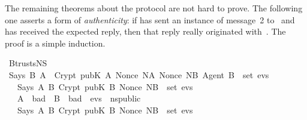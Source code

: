 \begin{isabellebody}
\begin{isamarkuptxt}
The remaining theorems about the protocol are not hard to prove.  The
following one asserts a form of \emph{authenticity}: if
 has sent an instance of message~2 to~ and has received the
expected reply, then that reply really originated with~.  The
proof is a simple induction.%
\end{isamarkuptxt}%
\isamarkuptrue%
%
\endisatagproof
{\isafoldproof}%
%
\isadelimproof
%
\endisadelimproof
%
\isadelimproof
%
\endisadelimproof
%
\isatagproof
%
\endisatagproof
{\isafoldproof}%
%
\isadelimproof
%
\endisadelimproof
{}\isamarkupfalse%
\ B{}trusts{}NS{}{}\isanewline
\ {}{}Says\ B\ A\ \ {}Crypt\ {}pubK\ A{}\ {}Nonce\ NA{}\ Nonce\ NB{}\ Agent\ B{}{}\ {}\ set\ evs{}\isanewline
\ \ \ Says\ A{}\ B\ {}Crypt\ {}pubK\ B{}\ {}Nonce\ NB{}{}\ {}\ set\ evs{}\isanewline
\ \ \ A\ {}\ bad{}\ \ B\ {}\ bad{}\ \ evs\ {}\ ns{}public{}\isanewline
\ \ {}\ Says\ A\ B\ {}Crypt\ {}pubK\ B{}\ {}Nonce\ NB{}{}\ {}\ set\ evs{}%
\isadelimproof
%
\endisadelimproof
%
\isatagproof
%
\endisatagproof
{\isafoldproof}%
%
\isadelimproof
%
\endisadelimproof
%
\isadelimproof

\end{isabellebody}
